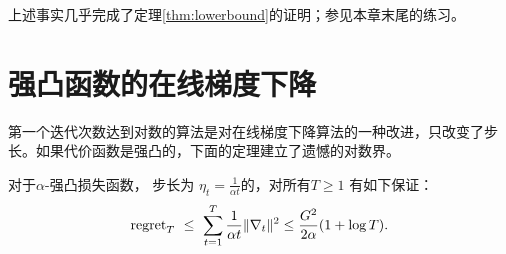 上述事实几乎完成了定理\ref{thm:lowerbound}的证明；参见本章末尾的练习。




\section{
	强凸函数的在线梯度下降
	} \label{section:ogdnew}


第一个迭代次数达到对数的算法是对在线梯度下降算法的一种改进，只改变了步长。如果代价函数是强凸的，下面的定理建立了遗憾的对数界。

\begin{theorem}\label{thm:gradient2}
对于$\alpha$-强凸损失函数，
步长为 $\eta_t = \frac{1}{\alpha {t}}$的\ogd，对所有$T\geq 1$ 有如下保证：
$$\regret_T\ \leq\  \sum_{t=1}^{T} \frac{1}{\alpha t} \|\nabla_t\|^2 \leq \frac{G^2}{2 \alpha}(1 + \log T).$$
\end{theorem}



